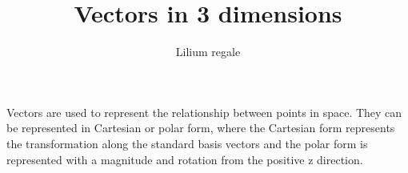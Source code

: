 \documentclass{report}
\author{Lilium regale}
\title{Vectors in 3 dimensions}
\begin{document}
Vectors are used to represent the relationship between points in space. They can be represented in Cartesian or polar form, where the Cartesian form represents the transformation along the standard basis vectors and the polar form is represented with a magnitude and rotation from the positive z direction. 
\end{document}
